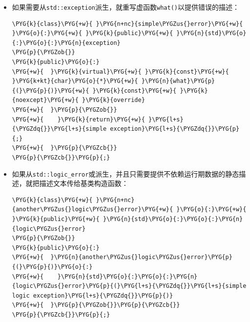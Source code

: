 \begin{itemize}
\item 如果需要从\texttt{std::\allowbreak{}exception}派生，就重写虚函数\texttt{what()}以提供错误的描述：



\begin{codeblockbg}
\begin{Verbatim}[commandchars=\\\{\},breaklines=true,breakanywhere=true,fontsize=\codefont,xleftmargin=17bp]
\PYG{k}{class}\PYG{+w}{ }\PYG{n+nc}{simple\PYGZus{}error}\PYG{+w}{ }\PYG{o}{:}\PYG{+w}{ }\PYG{k}{public}\PYG{+w}{ }\PYG{n}{std}\PYG{o}{:}\PYG{o}{:}\PYG{n}{exception}
\PYG{p}{\PYGZob{}}
\PYG{k}{public}\PYG{o}{:}
\PYG{+w}{  }\PYG{k}{virtual}\PYG{+w}{ }\PYG{k}{const}\PYG{+w}{ }\PYG{k+kt}{char}\PYG{o}{*}\PYG{+w}{ }\PYG{n}{what}\PYG{p}{(}\PYG{p}{)}\PYG{+w}{ }\PYG{k}{const}\PYG{+w}{ }\PYG{k}{noexcept}\PYG{+w}{ }\PYG{k}{override}
\PYG{+w}{  }\PYG{p}{\PYGZob{}}
\PYG{+w}{    }\PYG{k}{return}\PYG{+w}{ }\PYG{l+s}{\PYGZdq{}}\PYG{l+s}{simple exception}\PYG{l+s}{\PYGZdq{}}\PYG{p}{;}
\PYG{+w}{  }\PYG{p}{\PYGZcb{}}
\PYG{p}{\PYGZcb{}}\PYG{p}{;}
\end{Verbatim}
\end{codeblockbg}



\item 如果从\texttt{std::\allowbreak{}logic\_\allowbreak{}error}或派生，并且只需要提供不依赖运行期数据的静态描述，就把描述文本传给基类构造函数：



\begin{codeblockbg}
\begin{Verbatim}[commandchars=\\\{\},breaklines=true,breakanywhere=true,fontsize=\codefont,xleftmargin=17bp]
\PYG{k}{class}\PYG{+w}{ }\PYG{n+nc}{another\PYGZus{}logic\PYGZus{}error}\PYG{+w}{ }\PYG{o}{:}\PYG{+w}{ }\PYG{k}{public}\PYG{+w}{ }\PYG{n}{std}\PYG{o}{:}\PYG{o}{:}\PYG{n}{logic\PYGZus{}error}
\PYG{p}{\PYGZob{}}
\PYG{k}{public}\PYG{o}{:}
\PYG{+w}{  }\PYG{n}{another\PYGZus{}logic\PYGZus{}error}\PYG{p}{(}\PYG{p}{)}\PYG{o}{:}
\PYG{+w}{    }\PYG{n}{std}\PYG{o}{:}\PYG{o}{:}\PYG{n}{logic\PYGZus{}error}\PYG{p}{(}\PYG{l+s}{\PYGZdq{}}\PYG{l+s}{simple logic exception}\PYG{l+s}{\PYGZdq{}}\PYG{p}{)}
\PYG{+w}{  }\PYG{p}{\PYGZob{}}\PYG{p}{\PYGZcb{}}
\PYG{p}{\PYGZcb{}}\PYG{p}{;}
\end{Verbatim}
\end{codeblockbg}



\end{itemize}
